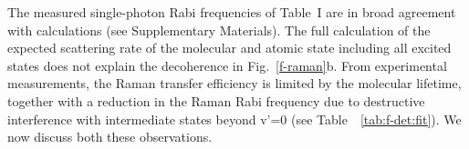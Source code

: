 \documentclass[aps,prl,twocolumn,10pt,superscriptaddress]{revtex4-1}
\newcommand{\todo}[1]{}
\newcounter{TRC}
\newcommand{\TR}[1]{\textcolor{violet}{[[\stepcounter{TRC} TR\arabic{TRC}: #1]]}}
\begin{document}


The measured single-photon Rabi frequencies of Table~I are in broad agreement with calculations (see Supplementary Materials).
The full calculation of the expected scattering rate of the molecular and atomic state including all excited states does not explain the decoherence in Fig.~\ref{f-raman}b.
From experimental measurements, the Raman transfer efficiency is limited by the molecular lifetime, together with a reduction in the Raman Rabi frequency due to destructive interference with intermediate states beyond v'=0 (see Table~~\ref{tab:f-det:fit}). We now discuss both these observations.
\end{document}
